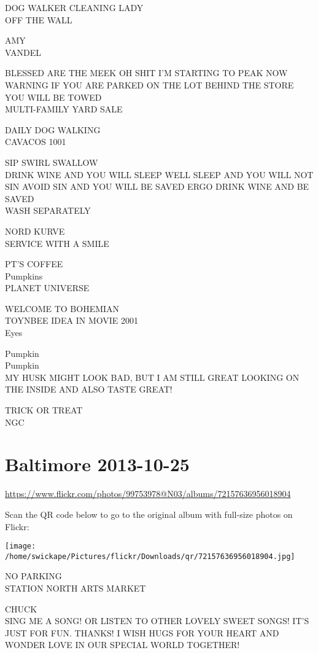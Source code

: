 \documentclass[10pt,letterpaper]{article}
\begin{document}
DOG WALKER CLEANING LADY\\
OFF THE WALL

AMY\\
VANDEL

BLESSED ARE THE MEEK OH SHIT I'M STARTING TO PEAK NOW\\
WARNING IF YOU ARE PARKED ON THE LOT BEHIND THE STORE YOU WILL BE TOWED\\
MULTI{-}FAMILY YARD SALE

DAILY DOG WALKING\\
CAVACOS 1001

SIP SWIRL SWALLOW\\
DRINK WINE AND YOU WILL SLEEP WELL SLEEP AND YOU WILL NOT SIN AVOID SIN AND YOU WILL BE SAVED ERGO DRINK WINE AND BE SAVED\\
WASH SEPARATELY

NORD KURVE\\
SERVICE WITH A SMILE

PT'S COFFEE\\
Pumpkins\\
PLANET UNIVERSE

WELCOME TO BOHEMIAN\\
TOYNBEE IDEA IN MOVIE 2001\\
Eyes

Pumpkin\\
Pumpkin\\
MY HUSK MIGHT LOOK BAD, BUT I AM STILL GREAT LOOKING ON THE INSIDE AND ALSO TASTE GREAT!

TRICK OR TREAT\\
NGC
\pagebreak

\section*{Baltimore 2013-10-25}

\url{https://www.flickr.com/photos/99753978@N03/albums/72157636956018904}

Scan the QR code below to go to the original album with full-size photos on Flickr:

\texttt{[image: /home/swickape/Pictures/flickr/Downloads/qr/72157636956018904.jpg]}
\pagebreak

NO PARKING\\
STATION NORTH ARTS MARKET

CHUCK\\
SING ME A SONG!  OR LISTEN TO OTHER LOVELY SWEET SONGS! IT'S JUST FOR FUN. THANKS! I WISH HUGS FOR YOUR HEART AND WONDER LOVE IN OUR SPECIAL WORLD TOGETHER!
\end{document}
